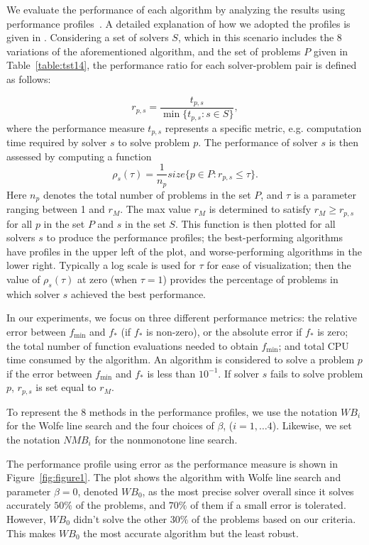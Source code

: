 \documentclass[]{interact}
\theoremstyle{plain}%
\theoremstyle{definition}
\theoremstyle{remark}
\begin{document}
{We evaluate the performance of each algorithm by analyzing the results using performance profiles~\cite{Dolan02}}. A detailed explanation of how we adopted the profiles is given in \cite{Loreto:19}.
{Considering a set of solvers $S$, which in this scenario includes the 8 variations of the aforementioned algorithm, and the set of problems $P$ given in Table~\ref{table:tst14}, the performance ratio for each solver-problem pair is defined as follows:}

\[r_{p,s}=\frac{t_{p,s}}{\min\{t_{p,s}:s \in S\}},\]
where {the performance measure $t_{p,s}$ represents a specific metric, e.g. computation time required  by solver $s$ to solve problem $p$.} The performance of solver $s$ is then assessed by computing a function
\begin{equation*}
\rho_s(\tau)=\frac{1}{n_p}size\{p\in P:r_{p,s} \leq \tau \}.
\end{equation*}
{Here  $n_p$ denotes the total number of problems in the set $P$, and $\tau$ is a parameter ranging between 1 and $r_M$. The max value $r_M$ is determined to satisfy $r_M\geq r_{p,s}$ for all $p$ in the set $P$ and $s$ in the set $S$.} This function is then plotted for all solvers $s$ to produce the performance profiles; the best-performing algorithms have profiles in the upper left of the plot, and worse-performing algorithms in the lower right. Typically a log scale is used for $\tau$ for ease of visualization; {then the value of $\rho_s(\tau)$ at zero (when $\tau = 1$) provides the percentage of problems in which solver $s$ achieved the best performance.}

{In our experiments, we focus on three different performance metrics: the relative error between $f_{\min}$ and $f_{*}$ (if $f_{*}$ is non-zero), or the absolute error if $f_{*}$ is zero; the total number of function evaluations needed to obtain $f_{\min}$; and total CPU time consumed by the algorithm. An algorithm is considered to solve a problem $p$ if the error between $f_{\min}$ and $f_{*}$  is less than $10^{-1}$. If solver $s$ fails to solve problem $p$, $r_{p,s}$ is set equal to $r_M$.}


To represent the 8 methods in the performance profiles, we use the notation $WB_i$ for the Wolfe line search and the four choices of $\beta$, ($i=1,\ldots 4$). Likewise, we set the notation $NMB_i$ for the nonmonotone line search.

The performance profile using error as the performance measure is shown in Figure~\ref{fig:figure1}. The plot shows the algorithm with Wolfe line search and parameter $\beta = 0$, denoted $WB_0$, as the most precise solver overall since it solves accurately $50\% $ of the problems, and $70\%$ of them if a small error is tolerated. However, $WB_0$ didn't solve the other $30\%$ of the problems based on our criteria. This makes $WB_0$ the most accurate algorithm but the least robust.
\end{document}
